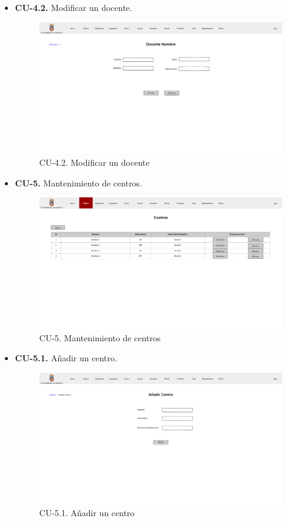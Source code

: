 \begin{itemize}
	\item \textbf{CU-4.2.} Modificar un docente.
	\begin{figure}[!h]
		\centering
		\includegraphics[width=\textwidth]{../img/Anexos/Vistas/mod_docente.png}
		\caption{CU-4.2. Modificar un docente}\label{fig:../img/Anexos/Vistas/mod_docente.png}
	\end{figure}
	
	\item \textbf{CU-5.} Mantenimiento de centros.
	\begin{figure}[!h]
		\centering
		\includegraphics[width=\textwidth]{../img/Anexos/Vistas/centros.png}
		\caption{CU-5. Mantenimiento de centros}\label{fig:../img/Anexos/Vistas/centros.png}
	\end{figure}
	
	\item \textbf{CU-5.1.} Añadir un centro.
	\begin{figure}[!h]
		\centering
		\includegraphics[width=\textwidth]{../img/Anexos/Vistas/add_centro.png}
		\caption{CU-5.1. Añadir un centro}\label{fig:../img/Anexos/Vistas/add_centro.png}
	\end{figure}
	

\end{itemize}
